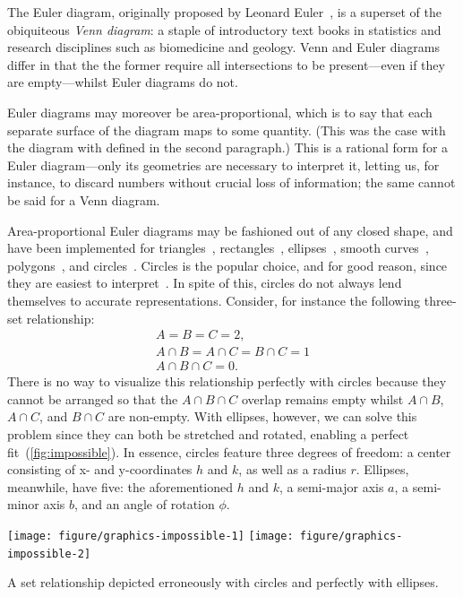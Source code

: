 \documentclass[
  oneside,
  openany,
  numbers=noendperiod,
  parskip=half,
  bibliography=totoc
]{scrbook}\usepackage[]{graphicx}\usepackage{xcolor}
\newenvironment{knitrout}{}{} %
\begin{document}
The Euler diagram, originally proposed by Leonard Euler~\citep{euler_1802}, is
a superset of the obiquiteous \emph{Venn diagram}: a staple of introductory
text books in statistics and research disciplines such as biomedicine and
geology. Venn and Euler diagrams differ in that the the former require all
intersections to be present---even if they are empty---whilst Euler diagrams do
not.

Euler diagrams may moreover be area-proportional, which is to say that each separate
surface of the diagram maps to some quantity. (This was the case with
the diagram with defined in the second paragraph.) This is a rational form for a
Euler diagram---only its geometries are necessary to interpret it, letting us, for
instance, to discard numbers without crucial loss of information; the same
cannot be said for a Venn diagram.

Area-proportional Euler diagrams may be fashioned out of any closed shape, and
have been implemented for triangles~\citep{swinton_2011},
rectangles~\citep{swinton_2011}, ellipses~\citep{micallef_2014a}, smooth
curves~\citep{micallef_2014}, polygons~\citep{swinton_2011}, and
circles~\citep{wilkinson_2012,kestler_2008,swinton_2011}. Circles is the
popular choice, and for good reason, since they are easiest to
interpret~\citep{blake_2016}. In spite of this, circles do not always lend
themselves to accurate representations. Consider, for instance the following
three-set relationship:
\[
\begin{gathered}
A = B = C = 2,\\
A \cap B = A \cap C = B \cap C = 1\\
A \cap B \cap C = 0.
\end{gathered}
\]
There is no way to visualize this relationship perfectly with circles because
they cannot be arranged so that the $A \cap B \cap C$ overlap remains empty whilst
$A \cap B$, $A \cap C$, and $B \cap C$ are non-empty. With ellipses, however,
we can solve this problem since they can both be stretched and rotated, enabling
a perfect fit~(\cref{fig:impossible}). In essence, circles
feature three degrees of freedom: a center consisting of x- and
y-coordinates $h$ and $k$, as well as a radius $r$. Ellipses, meanwhile, have
five: the aforementioned $h$ and $k$, a semi-major axis $a$, a semi-minor axis
$b$, and an angle of rotation $\phi$.

\begin{marginfigure}
\begin{knitrout}\small
{}\color{fgcolor}

{\centering \texttt{[image: figure/graphics-impossible-1]} 
\texttt{[image: figure/graphics-impossible-2]} 

}



\end{knitrout}
\caption{A set relationship depicted erroneously with circles and perfectly with
  ellipses.}
\label{fig:impossible}
\end{marginfigure}
\end{document}
